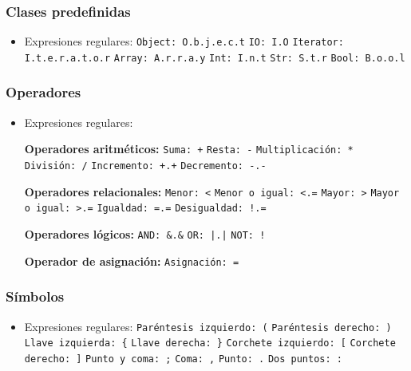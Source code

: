 \subsubsection{Clases predefinidas}
\begin{itemize}[leftmargin=*]
  \item Expresiones regulares:
  \subitem \verb~Object: O.b.j.e.c.t~
  \subitem \verb~IO: I.O~
  \subitem \verb~Iterator: I.t.e.r.a.t.o.r~
  \subitem \verb~Array: A.r.r.a.y~
  \subitem \verb~Int: I.n.t~
  \subitem \verb~Str: S.t.r~
  \subitem \verb~Bool: B.o.o.l~
\end{itemize}


\subsubsection{Operadores}
\begin{itemize}[leftmargin=*]
  \item Expresiones regulares:

  \subitem \textbf{Operadores aritméticos:}
  \subitem \verb~Suma: +~
  \subitem \verb~Resta: -~
  \subitem \verb~Multiplicación: *~
  \subitem \verb~División: /~
  \subitem \verb~Incremento: +.+~
  \subitem \verb~Decremento: -.-~

  \subitem \textbf{Operadores relacionales:}
  \subitem \verb~Menor: <~
  \subitem \verb~Menor o igual: <.=~
  \subitem \verb~Mayor: >~
  \subitem \verb~Mayor o igual: >.=~
  \subitem \verb~Igualdad: =.=~
  \subitem \verb~Desigualdad: !.=~

  \subitem \textbf{Operadores lógicos:}
  \subitem \verb~AND: &.&~
  \subitem \verb~OR: |.|~
  \subitem \verb~NOT: !~

  \subitem \textbf{Operador de asignación:}
  \subitem \verb~Asignación: =~
\end{itemize}


\subsubsection{Símbolos}
\begin{itemize}[leftmargin=*]
  \item Expresiones regulares:
  \subitem \verb~Paréntesis izquierdo: (~
  \subitem \verb~Paréntesis derecho: )~
  \subitem \verb~Llave izquierda: {~
  \subitem \verb~Llave derecha: }~
  \subitem \verb~Corchete izquierdo: [~
  \subitem \verb~Corchete derecho: ]~
  \subitem \verb~Punto y coma: ;~
  \subitem \verb~Coma: ,~
  \subitem \verb~Punto: .~
  \subitem \verb~Dos puntos: :~
\end{itemize}